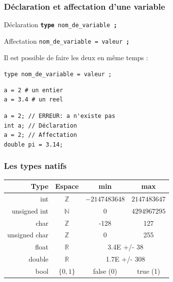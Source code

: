 \begin{frame}[fragile]
	\frametitle{Déclaration et affectation d'une variable}
	\begin{block}{Déclaration}
		\centering
		\texttt{\textbf{type} nom\_de\_variable \textbf{\huge ;}}
	\end{block}
	\begin{block}{Affectation}
		\centering
		\texttt{nom\_de\_variable = valeur \textbf{\huge ;}}
	\end{block}
	\vspace{0.5cm}
	Il est possible de faire les deux en même temps :
	\begin{center}
        \texttt{type nom_de_variable = valeur ;}
	\end{center}

	\begin{minipage}{0.40\linewidth}
		\begin{verbatim}
a = 2 # un entier
a = 3.4 # un reel
		\end{verbatim}
	\end{minipage}
	\hfill
	\begin{minipage}{0.57\linewidth}
		\begin{verbatim}
a = 2; // ERREUR: a n'existe pas
int a; // Déclaration 
a = 2; // Affectation
double pi = 3.14;
		\end{verbatim}
	\end{minipage}
\end{frame}

\begin{frame}
	\frametitle{Les types natifs}
	\begin{tabular}{|r|c|c|c|}
		\hline
		\textbf{Type} & \textbf{Espace} & \textbf{min} & \textbf{max}\\
		\hline
		int & $\mathbb{Z}$ & $-2147483648$ & $2147483647$ \\
		\hline
		unsigned int & $\mathbb{N}$ & $0$ & $4294967295$ \\
		\hline
		char & $\mathbb{Z}$ & -128 & 127\\
		\hline
		unsigned char & $\mathbb{Z}$ & 0 & 255\\
		\hline
		float & $\mathbb{R}$& \multicolumn{2}{c|}{3.4E +/- 38}\\
		\hline
		double & $\mathbb{R}$& \multicolumn{2}{c|}{1.7E +/- 308} \\
		\hline
		bool & $\{0,1\}$& false (0)& true (1)\\
		\hline
	\end{tabular}
\end{frame}

